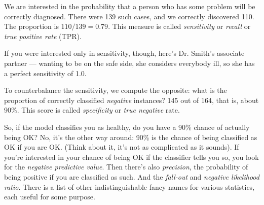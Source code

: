 We are interested in the probability that a person who has some problem will be correctly diagnosed. There were 139 such cases, and we correctly discovered 110. The proportion is $110 / 139 = 0.79$. This measure is called {\em sensitivity} or {\em recall} or {\em true positive rate} (TPR).

If you were interested only in sensitivity, though, here’s Dr. Smith’s associate partner — wanting to be on the safe side, she considers everybody ill, so she has a perfect sensitivity of 1.0.

To counterbalance the sensitivity, we compute the opposite: what is the proportion of correctly classified {\em negative} instances? 145 out of 164, that is, about 90\%. This score is called {\em specificity} or {\em true negative} rate.


So, if the model classifies you as healthy, do you have a 90\% chance of actually being OK? No, it’s the other way around: 90\% is the chance of being classified as OK if you are OK. (Think about it, it’s not as complicated as it sounds). If you’re interested in your chance of being OK if the classifier tells you so, you look for the {\em negative predictive value}. Then there’s also {\em precision}, the probability of being positive if you are classified as such. And the {\em fall-out} and {\em negative likelihood ratio}. There is a list of other indistinguishable fancy names for various statistics, each useful for some purpose.
